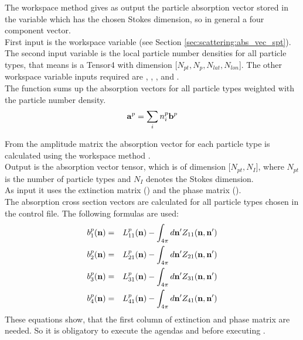 The workspace method  gives as output the
particle absorption vector  stored in the variable
 which has the chosen Stokes dimension, so in
general a four component vector.\\
First input is the workspace variable  (see Section
\ref{sec:scattering:abs_vec_spt}). The second input variable is the
local particle number densities  for all particle types,
that means  is a Tensor4 with dimension 
[$N_{pt}, N_{p}, N_{lat}, N_{lon}$]. The other workspace variable
inputs required are , ,
, and . \\  
The function sums up the absorption vectors for all particle types
weighted with the particle number density.
\begin{eqnarray}
  {\bf a}^{p} = \sum_i n^p_i {\bf b}^{p}
\end{eqnarray}


\label{sec:scattering:abs_vec_gas}


\label{sec:scattering:abs_vec_spt}

From the amplitude matrix the absorption vector for each
particle type is calculated using the workspace method
.\\
Output is the absorption vector tensor, which is  of  dimension
[$N_{pt}, N_{I}$], where $N_{pt}$ is the number of particle
types  and $N_{I}$ denotes the Stokes dimension.\\
As input it uses the extinction
matrix () and the phase matrix
().\\
The absorption cross section vectors \SAbVec{} are
calculated for all particle types chosen in the control
file. The following formulas are used:
\begin{eqnarray}
  \label{eq:gen_abs_vector}
  b^p_1({\bf n}) &=&  L^p_{11}({\bf n}) - \int_{4\pi} d{\bf n'}
  Z_{11}({\bf n, n'})\\
  b^p_2({\bf n}) &=&  L^p_{21}({\bf n}) - \int_{4\pi} d{\bf n'}
  Z_{21}({\bf n, n'})\\
  b^p_3({\bf n}) &=&  L^p_{31}({\bf n}) - \int_{4\pi} d{\bf n'}
  Z_{31}({\bf n, n'})\\
  b^p_4({\bf n}) &=&  L^p_{41}({\bf n}) - \int_{4\pi} d{\bf n'}
  Z_{41}({\bf n, n'})
\end{eqnarray}
These equations show, that the first column of extinction and phase
matrix are needed. So it is obligatory to execute the agendas
 and 
 before executing
. 



